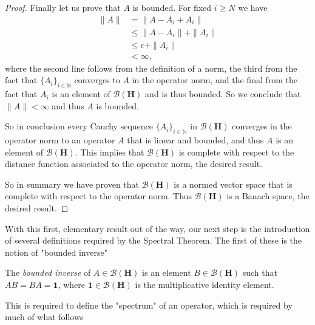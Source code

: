 \begin{proof}
Finally let us prove that $A$ is bounded. For fixed $i \ge N$ we have
\begin{align}
    \|A\| &=   \|A - A_i + A_i\| \\
          &\le \|A - A_i\| + \|A_i\| \\
          &\le \epsilon + \|A_i\| \\
          &< \infty,
\end{align}
where the second line follows from the definition of a norm, the third from the fact that $\{A_i\}_{i \in \mathbb{N}}$ converges to $A$ in the operator norm, and the final from the fact that $A_i$ is an element of $\mathcal{B}(\mathbf{H})$ and is thus bounded. So we conclude that $\|A\| < \infty$ and thus $A$ is bounded.

So in conclusion every Cauchy sequence $\{A_i\}_{i \in \mathbb{N}}$ in $\mathcal{B}(\mathbf{H})$ converges in the operator norm to an operator $A$ that is linear and bounded, and thus $A$ is an element of $\mathcal{B}(\mathbf{H})$. This implies that $\mathcal{B}(\mathbf{H})$ is complete with respect to the distance function associated to the operator norm, the desired result.

So in summary we have proven that $\mathcal{B}(\mathbf{H})$ is a normed vector space that is complete with respect to the operator norm. Thus $\mathcal{B}(\mathbf{H})$ is a Banach space, the desired result.
\end{proof}

With this first, elementary result out of the way, our next step is the introduction of several definitions required by the Spectral Theorem. The first of these is the notion of "bounded inverse"

\begin{definition}
    \label{def:bounded-inverse}
    \leanok
    The \textit{bounded inverse} of $A \in \mathcal{B}(\mathbf{H})$ is an element $B \in \mathcal{B}(\mathbf{H})$ such that $AB = BA = \mathbf{1}$, where $\mathbf{1} \in \mathcal{B}(\mathbf{H})$ is the multiplicative identity element.
\end{definition}

This is required to define the "spectrum" of an operator, which is required by much of what follows

